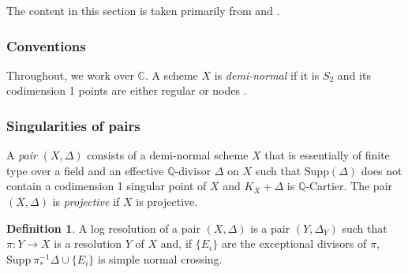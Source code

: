 \documentclass[11pt]{amsart}
\numberwithin{equation}{section}
\theoremstyle{definition}
\newtheorem{definition}[theorem]{Definition}
\newcommand{\bC}{\mathbb{C}}
\newcommand{\bQ}{\mathbb{Q}}
\newcommand{\Supp}{\textrm{Supp}}
\begin{document}
The content in this section is taken primarily from \cite{KM98} and \cite{Chenyang}.

\subsubsection{Conventions}
Throughout, we work over $\bC$. A scheme  $X$ is \emph{demi-normal} if it is $S_2$ and its codimension 1 points are either regular or nodes \cite[Definition 5.1]{Kol13}. 



\subsubsection{Singularities of pairs}
A \emph{pair} $(X,\Delta)$ consists of a demi-normal scheme $X$ that is essentially of finite type over a field and an effective $\bQ$-divisor $\Delta$ on $X$ such that  $\Supp(\Delta)$ does not contain a codimension 1 singular point of $X$ and
 $K_{X}+\Delta$ is $\bQ$-Cartier.
The pair $(X,\Delta)$ is  \emph{projective} if $X$ is projective.
 

\begin{definition}
    A log resolution of a pair $(X,\Delta)$ is a pair $(Y,\Delta_Y)$ such that $\pi: Y \to X$ is a resolution $Y$ of $X$ and, if $\{E_i\}$ are the exceptional divisors of $\pi$, $\mathrm{Supp} \ \pi^{-1}_* \Delta \cup \{E_i\}$ is simple normal crossing.
\end{definition}
\end{document}
